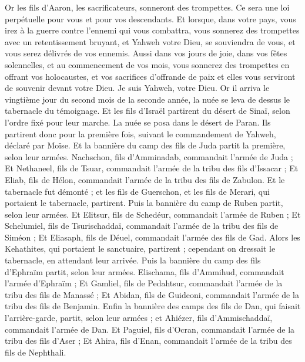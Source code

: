 \begin{multicols}{2}
Or les fils d'Aaron, les sacrificateurs, sonneront des trompettes. Ce sera une loi perpétuelle pour vous et pour vos descendants.
Et lorsque, dans votre pays, vous irez à la guerre contre l'ennemi qui vous combattra, vous sonnerez des trompettes avec un retentissement bruyant, et Yahweh votre Dieu, se souviendra de vous, et vous serez délivrés de vos ennemis.
Aussi dans vos jours de joie, dans vos fêtes solennelles, et au commencement de vos mois, vous sonnerez des trompettes en offrant vos holocaustes, et vos sacrifices d'offrande de paix et elles vous serviront de souvenir devant votre Dieu. Je suis Yahweh, votre Dieu.
Or il arriva le vingtième jour du second mois de la seconde année, la nuée se leva de dessus le tabernacle du témoignage.
Et les fils d'Israël partirent du désert de Sinaï, selon l'ordre fixé pour leur marche. La nuée se posa dans le désert de Paran.
Ils partirent donc pour la première fois, suivant le commandement de Yahweh, déclaré par Moïse.
Et la bannière du camp des fils de Juda partit la première, selon leur armées. Nachschon, fils d'Amminadab, commandait l'armée de Juda ;
Et Nethaneel, fils de Tsuar, commandait l'armée de la tribu des fils d'Issacar ;
Et Eliab, fils de Hélon, commandait l'armée de la tribu des fils de Zabulon.
Et le tabernacle fut démonté ; et les fils de Guerschon, et les fils de Merari, qui portaient le tabernacle, partirent.
Puis la bannière du camp de Ruben partit, selon leur armées. Et Elitsur, fils de Schedéur, commandait l'armée de Ruben ;
Et Schelumiel, fils de Tsurischaddaï, commandait l'armée de la tribu des fils de Siméon ;
Et Eliasaph, fils de Déuel, commandait l'armée des fils de Gad.
Alors les Kehathites, qui portaient le sanctuaire, partirent ; cependant on dressait le tabernacle, en attendant leur arrivée.
Puis la bannière du camp des fils d'Ephraïm partit, selon leur armées. Elischama, fils d'Ammihud, commandait l'armée d'Ephraïm ;
Et Gamliel, fils de Pedahtsur, commandait l'armée de la tribu des fils de Manassé ;
Et Abidan, fils de Guideoni, commandait l'armée de la tribu des fils de Benjamin.
Enfin la bannière des camps des fils de Dan, qui faisait l'arrière-garde, partit, selon leur armées ; et Ahiézer, fils d'Ammischaddaï, commandait l'armée de Dan.
Et Paguiel, fils d'Ocran, commandait l'armée de la tribu des fils d'Aser ;
Et Ahira, fils d'Enan, commandait l'armée de la tribu des fils de Nephthali.

\end{multicols}
